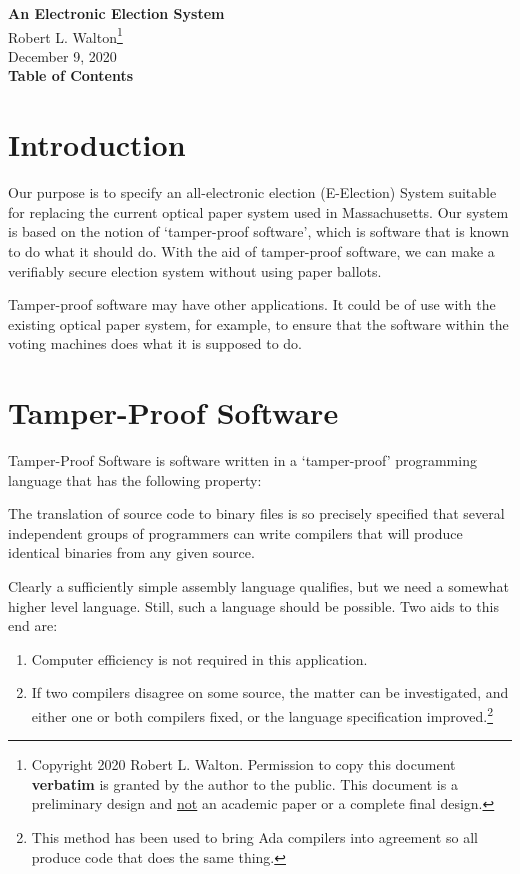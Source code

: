 \documentclass[12pt]{article}
\makeatletter
\renewcommand\tableofcontents{%
    \begin{list}{}%
	     {\setlength{\itemsep}{0in}%
	      \setlength{\topsep}{0in}%
	      \setlength{\parsep}{1ex}%
	      \setlength{\labelwidth}{0in}%
	      \setlength{\baselineskip}{1.5ex}%
	      \setlength{\leftmargin}{0.8in}%
	      \setlength{\rightmargin}{0.8in}}%
    \item\@starttoc{toc}%
    \end{list}}
\newenvironment{indpar}[1][0.3in]%
	{\begin{list}{}%
		     {\setlength{\itemsep}{0in}%
		      \setlength{\topsep}{0in}%
		      \setlength{\parsep}{1ex}%
		      \setlength{\labelwidth}{#1}%
		      \setlength{\leftmargin}{#1}%
		      \addtolength{\leftmargin}{\labelsep}}%
	 \item}%
	{\end{list}}
\makeatother
\begin{document}
        
\begin{center}
\Large
{\LARGE  \bf An Electronic Election System}
\\[2ex]
Robert L. Walton\footnote{Copyright 2020 Robert L. Walton.
Permission to copy this document {\bf verbatim} is granted by the author
to the public. This document is a preliminary design and
\underline{not} an academic paper or a complete final
design.}
\\[2ex]
December 9, 2020
\\[2ex]
{\bf Table of Contents}
\end{center}

\bigskip

\tableofcontents 

\newpage

\section{Introduction}

Our purpose is to specify an all-electronic election (E-Election) System
suitable for replacing the current optical paper system
used in Massachusetts.  Our system is based on the notion
of `tamper-proof software', which is software that is
known to do what it should do.  With the aid of tamper-proof
software, we can make a verifiably secure election system without
using paper ballots.

Tamper-proof software may have other applications.
It could be of use with the existing optical paper system,
for example, to ensure that the software within the voting
machines does what it is supposed to do.

\section{Tamper-Proof Software}

Tamper-Proof Software is software written in a `tamper-proof'
programming language
that has the following property:
\begin{indpar}
The translation of source code to binary files is so precisely
specified that several independent groups of programmers can
write compilers that will produce identical binaries from any
given source.
\end{indpar}

Clearly a sufficiently simple assembly language qualifies, but
we need a somewhat higher level language.  Still, such a language
should be possible.  Two aids to this end are:
\begin{enumerate}
\item
Computer efficiency is not required in this application.

\item
If two compilers disagree on some source, the matter can be
investigated, and either one or both compilers fixed, or the
language specification improved.\footnote{This method has been
used to bring Ada compilers into agreement so all produce
code that does the same thing.}
\end{enumerate}
\end{document}
